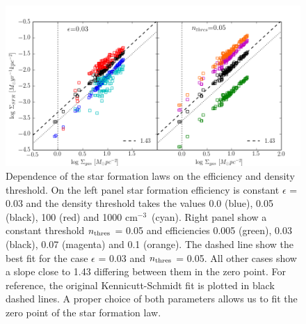 \documentclass[twocolumn]{aastex}
\newcommand{\cmmm}{cm$^{-3}$}
\begin{document}
	\begin{figure}[h]
	\begin{center}
	\includegraphics[scale=0.6]{./f12.png}
	\caption{Dependence of the star formation laws on the efficiency and density threshold. On the left panel star formation efficiency is constant $\epsilon$ = 0.03 and the density threshold takes the values 0.0 (blue), 0.05 (black), 100 (red) and 1000 \cmmm~(cyan). Right panel show a constant threshold $n_{\rm thres}$ = 0.05 and efficiencies 0.005 (green), 0.03 (black), 0.07 (magenta) and 0.1 (orange). The dashed line show the best fit for the case $\epsilon$ = 0.03 and $n_{\rm thres}$ = 0.05. All other cases show a slope close to 1.43 differing between them in the zero point. For reference, the original Kennicutt-Schmidt fit is plotted in black dashed lines. A proper choice of both parameters allows us to fit the zero point of the star formation law.}
	\label{fig:simulatedneff}
	\end{center}
	\end{figure}
\end{document}
